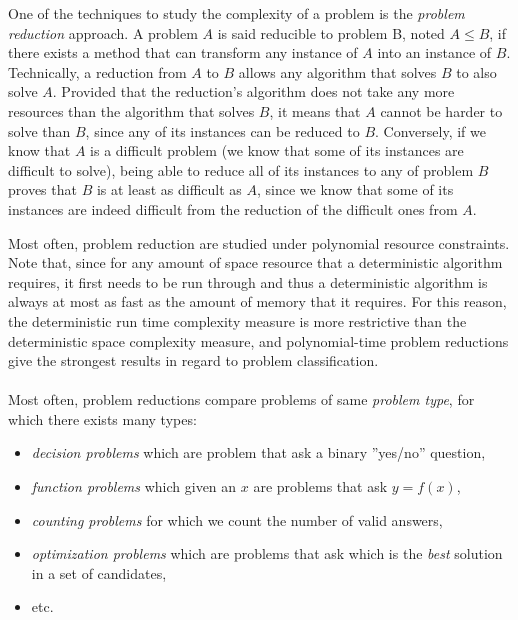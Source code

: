 	One of the techniques to study the complexity of a problem is the \emph{problem reduction} approach.
	A problem $A$ is said reducible to problem B, noted $A \leq B$, if there exists a method that can transform any instance of $A$ into an instance of $B$.
	Technically, a reduction from $A$ to $B$ allows any algorithm that solves $B$ to also solve $A$.
	Provided that the reduction's algorithm does not take any more resources than the algorithm that solves $B$, it means that $A$ cannot be harder to solve than $B$, since any of its instances can be reduced to $B$.
	Conversely, if we know that $A$ is a difficult problem (we know that some of its instances are difficult to solve), being able to reduce all of its instances to any of problem $B$ proves that $B$ is at least as difficult as $A$, since we know that some of its instances are indeed difficult from the reduction of the difficult ones from $A$.

	Most often, problem reduction are studied under polynomial resource constraints.
	Note that, since for any amount of space resource that a deterministic algorithm requires, it first needs to be run through and thus a deterministic algorithm is always at most as fast as the amount of memory that it requires.
	For this reason, the deterministic run time complexity measure is more restrictive than the deterministic space complexity measure, and polynomial-time problem reductions give the strongest results in regard to problem classification.

	\paragraph{}
	Most often, problem reductions compare problems of same \emph{problem type}, for which there exists many types:
	\begin{itemize}
		\item \emph{decision problems} which are problem that ask a binary ''yes/no'' question,
		\item \emph{function problems} which given an $x$ are problems that ask $y = f(x)$,
		\item \emph{counting problems} for which we count the number of valid answers,
		\item \emph{optimization problems} which are problems that ask which is the \emph{best} solution in a set of candidates,
		\item etc.
	\end{itemize}

